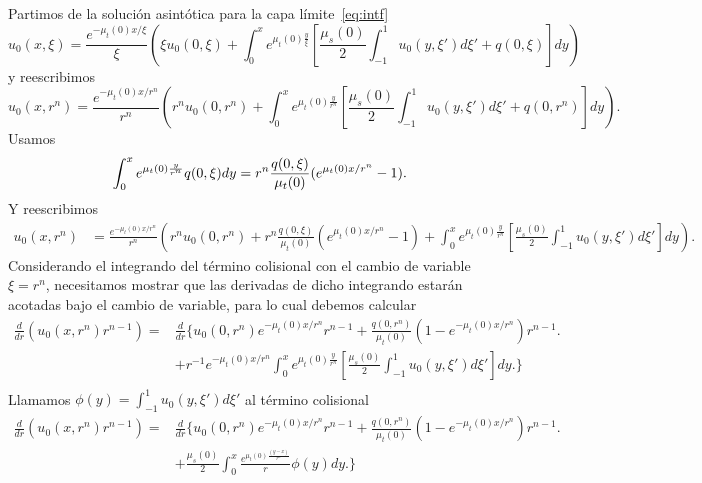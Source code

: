 Partimos de la solución asintótica para la capa límite~\eqref{eq:intf}
\begin{equation}
u_0(x,\xi) = \frac{e^{-\mu_t(0)x/\xi}}{\xi} \left(\xi u_0(0,\xi) + \int_0^{x} e^{\mu_t(0)\frac{y}{\xi}} \left[ \frac{\mu_s(0)}{2} \int_{-1}^1 u_0(y,\xi')d\xi' +q(0,\xi) \right] dy\right)
\label{eq:ecss}
\end{equation}
y reescribimos
\begin{equation}
u_0(x,r^n) = \frac{e^{-\mu_t(0)x/r^n}}{r^n} \left(r^n u_0(0,r^n) + \int_0^{x} e^{\mu_t(0)\frac{y}{r^n}} \left[ \frac{\mu_s(0)}{2} \int_{-1}^1 u_0(y,\xi')d\xi' +q(0,r^n) \right] dy\right).
\label{eq:ecsscv}
\end{equation}
Usamos
\begin{equation*}
\begin{split}
\int_0^{x} e^{\mu_t(0)\frac{y}{r^n}}q(0,\xi)dy=r^n\frac{q(0,\xi)}{\mu_t(0)}(e^{\mu_t(0)x/r^n}-1).
\end{split}
\raisetag{50pt}
\label{eq:boundedder2aux}
\end{equation*}
Y reescribimos
\begin{equation}
\begin{split}
u_0(x,r^n)& =\frac{e^{-\mu_t(0)x/r^n}}{r^n} \left(r^n u_0(0,r^n) +  r^n\frac{q(0,\xi)}{\mu_t(0)}(e^{\mu_t(0)x/r^n}-1) + \int_0^{x} e^{\mu_t(0)\frac{y}{r^n}} \left[ \frac{\mu_s(0)}{2} \int_{-1}^1 u_0(y,\xi')d\xi' \right] dy\right).
\end{split}
\label{eq:ecss2}
\end{equation}
Considerando el integrando del término colisional con el cambio de variable $\xi=r^n$, necesitamos mostrar que las derivadas de dicho integrando 
estarán acotadas bajo el cambio de variable, para lo cual debemos calcular
\begin{equation}
\begin{split}
\frac{d }{dr} \left( u_0(x,r^n) r^{n-1} \right)=&\frac{d }{dr} \Bigg\{ 
u_0(0,r^n) e^{-\mu_t(0)x/r^n}r^{n-1} + \frac{q(0,r^n)}{\mu_t(0)}\left(1-e^{-\mu_t(0)x/r^n}\right)r^{n-1}  \Bigg.\\
&+r^{-1}e^{-\mu_t(0)x/r^n}  \int_0^{x} e^{\mu_t(0)\frac{y}{r^n}} \left[ \frac{\mu_s(0)}{2} \int_{-1}^1 u_0(y,\xi')d\xi' \right] dy \Bigg. \Bigg\}\\
\end{split}
\label{eq:boundedder}
\end{equation}
Llamamos $\phi(y)=\int_{-1}^1 u_0(y,\xi')d\xi'$ al término colisional
\begin{equation}
\begin{split}
\frac{d }{dr} \left( u_0(x,r^n) r^{n-1} \right)=&\frac{d }{dr} \Bigg\{ 
u_0(0,r^n) e^{-\mu_t(0)x/r^n}r^{n-1} + \frac{q(0,r^n)}{\mu_t(0)}\left(1-e^{-\mu_t(0)x/r^n}\right)r^{n-1}  \Bigg.\\
&+ \frac{\mu_s(0)}{2} \int_0^{x} \frac{e^{\mu_t(0)\frac{(y-x)}{r^n}}}{r} \phi(y) dy \Bigg. \Bigg\}
\end{split}
\label{eq:boundedder2}
\end{equation}
